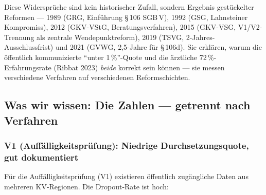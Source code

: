 \documentclass{umbruch-position}
\begin{document}
Diese Widerspr\"uche sind kein historischer Zufall, sondern Ergebnis gest\"uckelter Reformen --- 1989 (GRG, Einf\"uhrung \S\,106 SGB\,V), 1992 (GSG, Lahnsteiner Kompromiss), 2012 (GKV-VStG, Beratungsverfahren), 2015 (GKV-VSG, V1/V2-Trennung als zentrale Wendepunktreform), 2019 (TSVG, 2-Jahres-Ausschlussfrist) und 2021 (GVWG, 2,5-Jahre f\"ur \S\,106d). Sie erkl\"aren, warum die \"offentlich kommunizierte ``unter 1\,\%''-Quote und die \"arztliche 72\,\%-Erfahrungsrate (Ribbat 2023) \textit{beide} korrekt sein k\"onnen --- sie messen verschiedene Verfahren auf verschiedenen Reformschichten.

\subsection{Was wir wissen: Die Zahlen --- getrennt nach Verfahren}

\subsubsection{V1 (Auffälligkeitsprüfung): Niedrige Durchsetzungsquote, gut dokumentiert}

Für die Auffälligkeitsprüfung (V1) existieren öffentlich zugängliche Daten aus mehreren KV-Regionen. Die Dropout-Rate ist hoch:

\begin{center}
\end{center}
\end{document}
